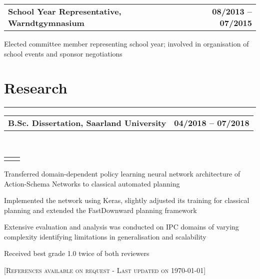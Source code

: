 \documentclass[]{deedy-resume}
\makeatletter
\newcommand{\headerrow}[2]
{\begin{tabular*}{\linewidth}{l@{\extracolsep{\fill}}r}
	\fontspec{Helvetica}\fontsize{12pt}{12pt}\selectfont\bfseries{\color{subheadings}#1} &
	\fontspec{Helvetica}\fontsize{12pt}{12pt}\selectfont\bfseries{\color{subheadings}#2} \\
\end{tabular*}}
\newcommand{\locationrow}[2]
{\begin{tabular*}{\linewidth}{l@{\extracolsep{\fill}}r}
        \color{headings}\scshape\fontspec{Heiti TC Medium}\fontsize{10pt}{12pt}\selectfont{#1}  &
        \color{headings}\scshape\fontspec{Heiti TC Medium}\fontsize{10pt}{12pt}\selectfont{#2}  \\
\end{tabular*}}
\makeatother
\begin{document}
\noindent
\headerrow{School Year Representative, Warndtgymnasium}{08/2013 -- 07/2015}
\begin{tightitemize}{1.7em}
    \item Elected committee member representing school year; involved in organisation of school events and sponsor
    negotiations
\end{tightitemize}
\largesectionsep


\section*{Research}
\hrule
\vspace{0.4em}

\noindent
\headerrow{B.Sc. Dissertation, Saarland University}{04/2018 -- 07/2018}
\\
\locationrow{Foundations of Artificial Intelligence (FAI) Group}{}
\begin{tightitemize}{1.7em}
    \item Transferred domain-dependent policy learning neural network architecture of Action-Schema Networks to
    classical automated planning
    \item Implemented the network using Keras, slightly adjusted its training for classical planning and extended 
    the FastDownward planning framework
    \item Extensive evaluation and analysis was conducted on IPC domains of varying complexity identifying
    limitations in generalisation and scalability
    \item Received best grade 1.0 twice of both reviewers
\end{tightitemize}
\largesectionsep


[\scshape{}\fontsize{10pt}{8pt}\selectfont References available on request - Last updated on \today]
\end{document}
